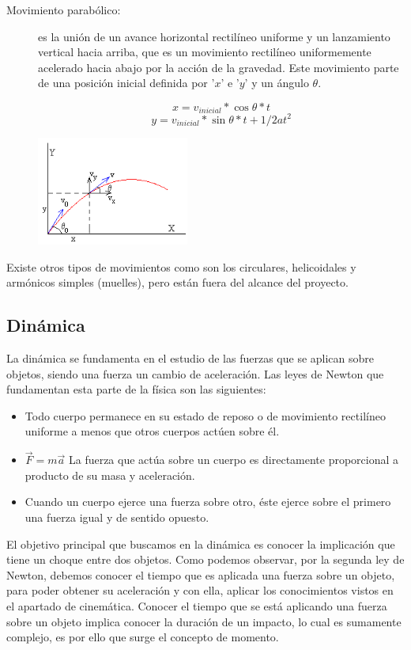 \begin{description}
\item [Movimiento parabólico:]  es la unión de un avance horizontal rectilíneo uniforme y un lanzamiento vertical hacia arriba, que es un movimiento rectilíneo uniformemente acelerado hacia abajo por la acción de la gravedad. Este movimiento parte de una posición inicial definida por '$x$' e '$y$' y un ángulo $\theta$.

\parbox{7cm} {
$$    x = v_{inicial} * \cos{ \theta } * t  $$
$$    y = v_{inicial} * \sin{ \theta } * t  + 1/2 a t^2  $$
}
\parbox{5cm}{\includegraphics[width=5cm]{img/cinematica_MP.png}}

\end{description}

Existe otros tipos de movimientos como son los circulares, helicoidales y armónicos simples (muelles), pero están fuera del alcance del proyecto.

\subsection{Dinámica}

La dinámica se fundamenta en el estudio de las fuerzas que se aplican sobre objetos, siendo una fuerza un cambio de aceleración. Las leyes de Newton que fundamentan esta parte de la física son las siguientes:
\begin{itemize}
\item Todo cuerpo permanece en su estado de reposo o de movimiento rectilíneo uniforme a menos que otros cuerpos actúen sobre él.
\item $\vec{F} = m \vec{a} $ La fuerza que actúa sobre un cuerpo es directamente proporcional a producto de su masa y aceleración.
\item Cuando un cuerpo ejerce una fuerza sobre otro, éste ejerce sobre el primero una fuerza igual y de sentido opuesto.
\end{itemize}

El objetivo principal que buscamos en la dinámica es conocer la implicación que tiene un choque entre dos objetos. Como podemos observar, por la segunda ley de Newton, debemos conocer el tiempo que es aplicada una fuerza sobre un objeto, para poder obtener su aceleración y con ella, aplicar los conocimientos vistos en el apartado de cinemática. Conocer el tiempo que se está aplicando una fuerza sobre un objeto implica conocer la duración de un impacto, lo cual es sumamente complejo, es por ello que surge el concepto de momento.
\newline

